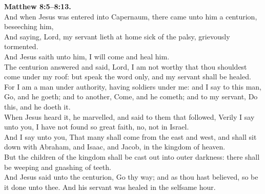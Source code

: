 \documentclass[10pt]{article} %
\begin{document}
{\begin{minipage}[t]{0.45\textwidth}
\textbf{Matthew 8:5--8:13.}\\
And when Jesus was entered into Capernaum, there came unto him a centurion, beseeching him,\\
And saying, Lord, my servant lieth at home sick of the palsy, grievously tormented.\\
And Jesus saith unto him, I will come and heal him.\\
The centurion answered and said, Lord, I am not worthy that thou shouldest come under my roof: but speak the word only, and my servant shall be healed.\\
For I am a man under authority, having soldiers under me: and I say to this man, Go, and he goeth; and to another, Come, and he cometh; and to my servant, Do this, and he doeth it.\\
When Jesus heard it, he marvelled, and said to them that followed, Verily I say unto you, I have not found so great faith, no, not in Israel.\\
And I say unto you, That many shall come from the east and west, and shall sit down with Abraham, and Isaac, and Jacob, in the kingdom of heaven.\\
But the children of the kingdom shall be cast out into outer darkness: there shall be weeping and gnashing of teeth.\\
And Jesus said unto the centurion, Go thy way; and as thou hast believed, so be it done unto thee. And his servant was healed in the selfsame hour.\\

\end{minipage}}
\vspace*{\fill}
\newpage
\Huge%
\vspace*{\fill}
\begin{spacing}{1.0}
\end{spacing}
\vspace*{\fill}
\end{document}
